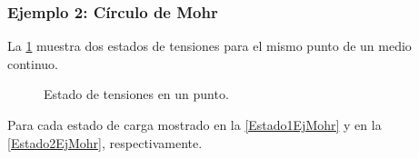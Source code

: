 \documentclass[../notas medios.tex]{subfiles}
\begin{document}
%
\subsubsection*{Ejemplo 2: Círculo de Mohr} 

La \cref{planosEjMohr} muestra dos estados de tensiones para el mismo punto de
un medio continuo. 
%
\begin{figure}[H]
	\centering
		\hspace{0.5cm}
	\caption{Estado de tensiones en un punto. }
	\label{planosEjMohr}
\end{figure}
%
Para cada estado de carga mostrado en la  \cref{Estado1EjMohr} y en la  \cref{Estado2EjMohr}, respectivamente.
\end{document}
